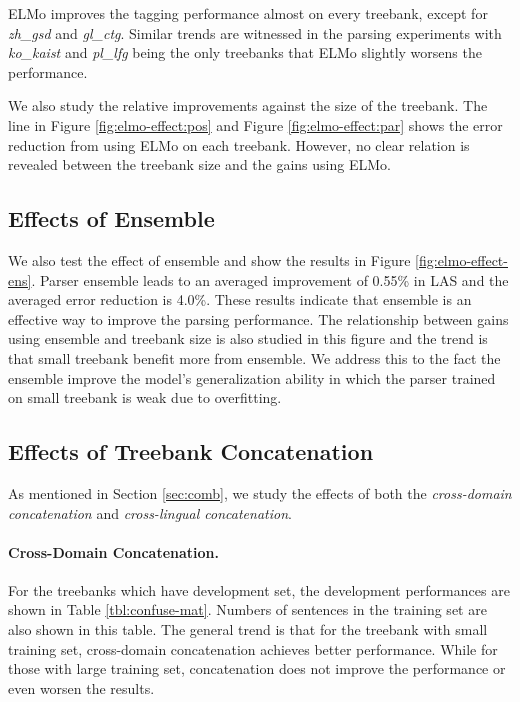 \documentclass[11pt,a4paper]{article}
\begin{document}
ELMo improves the tagging performance almost on every treebank,
except for \textit{zh\_gsd} and \textit{gl\_ctg}.
Similar trends are witnessed in the parsing experiments with \textit{ko\_kaist}
and \textit{pl\_lfg} being the only treebanks that ELMo slightly worsens the performance.

We also study the relative improvements against the size of the treebank.
The line in Figure \ref{fig:elmo-effect:pos} and Figure \ref{fig:elmo-effect:par}
shows the error reduction from using ELMo on each treebank.
However, no clear relation is revealed between the treebank size and the gains using ELMo.

\subsection{Effects of Ensemble}

We also test the effect of ensemble and show
the results in Figure \ref{fig:elmo-effect-ens}.
Parser ensemble leads to an averaged improvement of 0.55\% in LAS
and the averaged error reduction is 4.0\%.
These results indicate that ensemble is an effective way to
improve the parsing performance.
The relationship between gains using ensemble and treebank size
is also studied in this figure and the trend is that small treebank benefit more
from ensemble.
We address this to the fact the ensemble improve the model's generalization
ability in which the parser trained on small treebank is weak due to overfitting.

\subsection{Effects of Treebank Concatenation}\label{sec:treebank-concat}
As mentioned in Section \ref{sec:comb},
we study the effects of both the \textit{cross-domain concatenation} and \textit{cross-lingual concatenation}.
\paragraph{Cross-Domain Concatenation.}


For the treebanks which have development set, the development performances
are shown in Table \ref{tbl:confuse-mat}.
Numbers of sentences in the training set are also shown in this table.
The general trend is that for the treebank with small training set,
cross-domain concatenation achieves better performance.
While for those with large training set, concatenation does not improve
the performance or even worsen the results.
\end{document}

